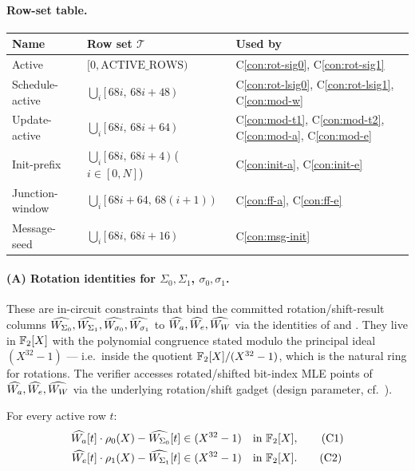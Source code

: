 \paragraph{Row-set table.}
\begin{center}
\small
\begin{tabular}{lll}
\toprule
\textbf{Name} & \textbf{Row set $\mathcal{T}$} & \textbf{Used by} \\
\midrule
Active                & $[0, \mathrm{ACTIVE\_ROWS})$ & C\ref{con:rot-sig0}, C\ref{con:rot-sig1} \\
Schedule-active       & $\bigcup_i [\,68i,\,68i + 48\,)$ & C\ref{con:rot-lsig0}, C\ref{con:rot-lsig1}, C\ref{con:mod-w} \\
Update-active         & $\bigcup_i [\,68i,\,68i + 64\,)$ & C\ref{con:mod-t1}, C\ref{con:mod-t2}, C\ref{con:mod-a}, C\ref{con:mod-e} \\
Init-prefix           & $\bigcup_i [\,68i,\,68i + 4\,)$ ($i \in [0,N]$) & C\ref{con:init-a}, C\ref{con:init-e} \\
Junction-window       & $\bigcup_i [\,68i + 64,\,68(i{+}1)\,)$ & C\ref{con:ff-a}, C\ref{con:ff-e} \\
Message-seed          & $\bigcup_i [\,68i,\,68i + 16\,)$ & C\ref{con:msg-init} \\
\bottomrule
\end{tabular}
\end{center}


\paragraph{(A) Rotation identities for $\Sigma_0, \Sigma_1$, $\sigma_0, \sigma_1$.}

These are in-circuit constraints that bind the committed
rotation/shift-result columns $\widehat{W_{\Sigma_0}}, \widehat{W_{\Sigma_1}},
\widehat{W_{\sigma_0}}, \widehat{W_{\sigma_1}}$ to $\widehat{W_a}, \widehat{W_e},
\widehat{W_W}$ via the identities of  and
. They live in $\mathbb{F}_2[X]$ with the polynomial
congruence stated modulo the principal ideal $(X^{32}-1)$ — i.e.\
inside the quotient $\mathbb{F}_2[X]/(X^{32}-1)$, which is the natural ring for rotations.
The verifier accesses rotated/shifted bit-index MLE points of
$\widehat{W_a}, \widehat{W_e}, \widehat{W_W}$ via the underlying rotation/shift gadget
(design parameter, cf.\ \Cref{rem:virtual-cols}).

For every active row $t$:
\begin{align}
\widehat{W_a}[t] \cdot \rho_{0}(X) - \widehat{W_{\Sigma_0}}[t] &\in (X^{32}-1) \quad \text{in } \mathbb{F}_2[X], \tag{C1}\label{con:rot-sig0}\\
\widehat{W_e}[t] \cdot \rho_{1}(X) - \widehat{W_{\Sigma_1}}[t] &\in (X^{32}-1) \quad \text{in } \mathbb{F}_2[X]. \tag{C2}\label{con:rot-sig1}
\end{align}

